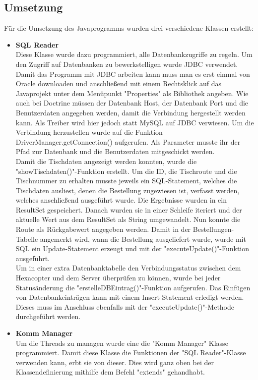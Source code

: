   \subsection{Umsetzung}
Für die Umsetzung des Javaprogramms wurden drei verschiedene Klassen erstellt:
\begin{itemize}
    \item \textbf{SQL Reader}\\
Diese Klasse wurde dazu programmiert, alle Datenbankzugriffe zu regeln.
Um den Zugriff auf Datenbanken zu bewerkstelligen wurde JDBC verwendet. 
Damit das Programm mit JDBC arbeiten kann muss man es erst einmal von Oracle downloaden und anschließend mit einem Rechtsklick auf das Javaprojekt unter dem Menüpunkt "Properties" als Bibliothek angeben.
Wie auch bei Doctrine müssen der Datenbank Host, der Datenbank Port und die Benutzerdaten angegeben werden, damit die Verbindung hergestellt werden kann.
Als Treiber wird hier jedoch statt MySQL auf JDBC verwiesen. 
Um die Verbindung herzustellen wurde auf die Funktion DriverManager.getConnection() aufgerufen. Als Parameter musste ihr der Pfad zur Datenbank und die Benutzerdaten mitgeschickt werden.
\\
Damit die Tischdaten angezeigt werden konnten, wurde die "showTischdaten()"-Funktion erstellt. Um die ID, die Tischroute und die Tischnummer zu erhalten musste jeweils ein SQL-Statement, welches die Tischdaten ausliest, denen die Bestellung zugewiesen ist, verfasst werden, welches anschließend ausgeführt wurde.
Die Ergebnisse wurden in ein ResultSet gespeichert. Danach wurden sie in einer Schleife iteriert und der aktuelle Wert aus dem ResultSet als String umgewandelt. Nun konnte die Route als Rückgabewert angegeben werden. Damit in der Bestellungen-Tabelle angemerkt wird, wann die Bestellung ausgeliefert wurde, wurde mit SQL ein Update-Statement erzeugt und mit der "executeUpdate()"-Funktion ausgeführt.
\\
Um in einer extra Datenbanktabelle den Verbindungsstatus zwischen dem Hexacopter und dem Server überprüfen zu können, wurde bei jeder Statusänderung die "erstelleDBEintrag()"-Funktion aufgerufen. Das Einfügen von Datenbankeinträgen kann mit einem Insert-Statement erledigt werden. Dieses muss im Anschluss ebenfalls mit der "executeUpdate()"-Methode durchgeführt werden.
    \item \textbf{Komm Manager}\\
Um die Threads zu managen wurde eine die "Komm Manager" Klasse programmiert.
Damit diese Klasse die Funktionen der "SQL Reader"-Klasse verwenden kann, erbt sie von dieser. Dies wird ganz oben bei der Klassendefinierung mithilfe dem Befehl "extends" gehandhabt. 

\end{itemize}
